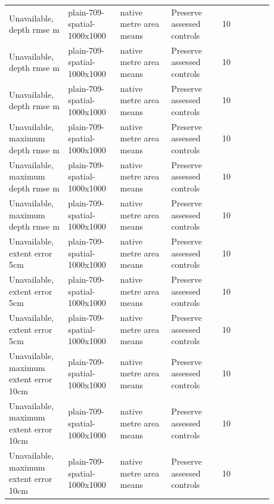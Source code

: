 \begin{longtable}{p{0.1760\linewidth}p{0.1760\linewidth}p{0.1760\linewidth}p{0.1760\linewidth}p{0.1760\linewidth}}
Unavailable, depth rmse m & plain-709-spatial-1000x1000 & native metre area means & Preserve assessed controls & 10 \\
Unavailable, depth rmse m & plain-709-spatial-1000x1000 & native metre area means & Preserve assessed controls & 10 \\
Unavailable, depth rmse m & plain-709-spatial-1000x1000 & native metre area means & Preserve assessed controls & 10 \\
Unavailable, maximum depth rmse m & plain-709-spatial-1000x1000 & native metre area means & Preserve assessed controls & 10 \\
Unavailable, maximum depth rmse m & plain-709-spatial-1000x1000 & native metre area means & Preserve assessed controls & 10 \\
Unavailable, maximum depth rmse m & plain-709-spatial-1000x1000 & native metre area means & Preserve assessed controls & 10 \\
Unavailable, extent error 5cm & plain-709-spatial-1000x1000 & native metre area means & Preserve assessed controls & 10 \\
Unavailable, extent error 5cm & plain-709-spatial-1000x1000 & native metre area means & Preserve assessed controls & 10 \\
Unavailable, extent error 5cm & plain-709-spatial-1000x1000 & native metre area means & Preserve assessed controls & 10 \\
Unavailable, maximum extent error 10cm & plain-709-spatial-1000x1000 & native metre area means & Preserve assessed controls & 10 \\
Unavailable, maximum extent error 10cm & plain-709-spatial-1000x1000 & native metre area means & Preserve assessed controls & 10 \\
Unavailable, maximum extent error 10cm & plain-709-spatial-1000x1000 & native metre area means & Preserve assessed controls & 10 \\
\end{longtable}
